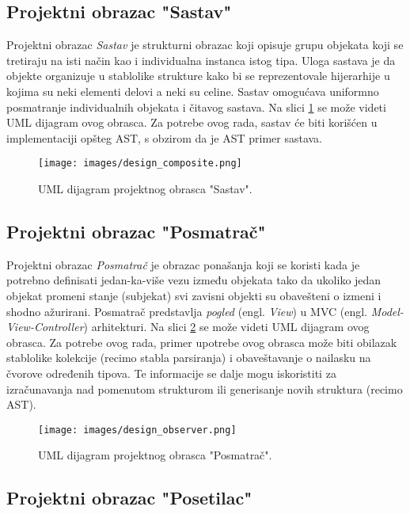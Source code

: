 \subsection{Projektni obrazac "Sastav"}
\label{subsec:DesignPatternsListener}

Projektni obrazac \emph{Sastav} je strukturni obrazac koji opisuje grupu objekata koji se tretiraju na isti način kao i individualna instanca istog tipa. Uloga sastava je da objekte organizuje u stablolike strukture kako bi se reprezentovale hijerarhije u kojima su neki elementi delovi a neki su celine. Sastav omogućava uniformno posmatranje individualnih objekata i čitavog sastava. Na slici \ref{fig:UMLComposite} se može videti UML dijagram \cite{UML} ovog obrasca. Za potrebe ovog rada, sastav će biti korišćen u implementaciji opšteg AST, s obzirom da je AST primer sastava.  

\begin{figure}[h!]
    \centering
    \texttt{[image: images/design\_composite.png]}
    \caption{UML dijagram projektnog obrasca "Sastav".} 
    \label{fig:UMLComposite}
\end{figure}

\subsection{Projektni obrazac "Posmatrač"}
\label{subsec:DesignPatternsObserver}

Projektni obrazac \emph{Posmatrač} je obrazac ponašanja koji se koristi kada je potrebno definisati jedan-ka-više vezu između objekata tako da ukoliko jedan objekat promeni stanje (subjekat) svi zavisni objekti su obavešteni o izmeni i shodno ažurirani. Posmatrač predstavlja \emph{pogled} (engl. \emph{View}) u MVC (engl. \emph{Model-View-Controller}) arhitekturi. Na slici \ref{fig:UMLObserver} se može videti UML dijagram \cite{UML} ovog obrasca. Za potrebe ovog rada, primer upotrebe ovog obrasca može biti obilazak stablolike kolekcije (recimo stabla parsiranja) i obaveštavanje o nailasku na čvorove određenih tipova. Te informacije se dalje mogu iskoristiti za izračunavanja nad pomenutom strukturom ili generisanje novih struktura (recimo AST). 

\begin{figure}[h!]
\centering
\texttt{[image: images/design\_observer.png]}
\caption{UML dijagram projektnog obrasca "Posmatrač".}
\label{fig:UMLObserver}
\end{figure}

\subsection{Projektni obrazac "Posetilac"}
\label{subsec:DesignPatternsListener}

